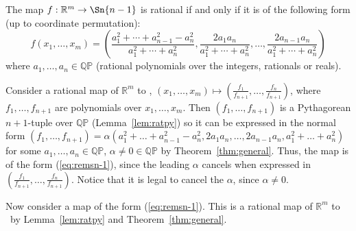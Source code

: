 \documentclass[12pt]{article}
\begin{document}
\begin{theorem}
\label{thm:ratmap}
The map $f: \mathbb{R}^m \rightarrow \Sn{n-1}$ is rational if and only if
it is of the following form (up to coordinate permutation):
\begin{equation}
\label{eq:remsn-1}
f(x_1,\ldots,x_m) = 
(\frac{a_1^2 + \cdots + a_{n-1}^2 - a_n^2}{a_1^2 + \cdots + a_n^2},
	 \frac{2a_1a_n}{a_1^2 + \cdots + a_n^2},
	 \ldots, 
	 \frac{2a_{n-1}a_n}{a_1^2 + \cdots + a_n^2})
\end{equation}
where $a_1,\ldots,a_n \in \mathbb{QP}$ (rational polynomials over the
integers, rationals or reals).
\end{theorem}
\prf
Consider a rational map
of $\mathbb{R}^m$ to , $(x_1,\ldots,x_m) \mapsto 
(\frac{f_1}{f_{n+1}},\ldots,\frac{f_n}{f_{n+1}})$,
where $f_1,\ldots,f_{n+1}$ are polynomials over $x_1,\ldots,x_m$.
Then $(f_1,\ldots,f_{n+1})$ is a Pythagorean $n+1$-tuple 
over $\mathbb{QP}$ (Lemma~\ref{lem:ratpy})
so it can be expressed in the normal form
$(f_1,\ldots,f_{n+1}) = \alpha (a_1^2 + \ldots + a_{n-1}^2 - a_n^2,
2a_1a_n,\ldots,2a_{n-1}a_n,a_1^2 + \ldots + a_n^2)$
for some $a_1,\ldots,a_n \in \mathbb{QP}$, $\alpha \neq 0 \in \mathbb{QP}$
by Theorem~\ref{thm:general}.
Thus, the map is of the form (\ref{eq:remsn-1}), since the leading $\alpha$
cancels when expressed in 
$(\frac{f_1}{f_{n+1}},\ldots,\frac{f_n}{f_{n+1}})$.
Notice that it is legal to cancel the $\alpha$, since $\alpha \neq 0$.

Now consider a map of the form (\ref{eq:remsn-1}).
This is a rational map of $\mathbb{R}^m$ to \ by Lemma~\ref{lem:ratpy} 
and Theorem~\ref{thm:general}.
\QED
\end{document}
